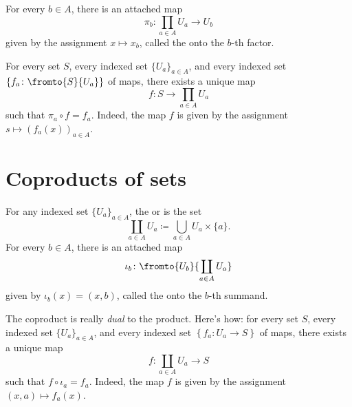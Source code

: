 For every $b\in A$, there is an attached map
\[
	\pi_b \colon \prod_{a\in A}U_a \to U_b
\]
given by the assignment $x \mapsto x_b$, called the  onto the $b$-th factor.

For every set $S$, every indexed set $\{U_a\}_{a\in A}$, and every indexed set $\left\{f_a\colon\fromto{S}{U_a}\right\}$ of maps, there exists a unique map
\[
	f\colon S \to \prod_{a\in A}U_a
\]
such that $\pi_a\circ f=f_a$.
Indeed, the map $f$ is given by the assignment $s \mapsto (f_a(x))_{a\in A}$.

\section{Coproducts of sets}%
\label{sec:coproducts_of_sets}

For any indexed set $\{U_a\}_{a\in A}$, the  or  is the set
\[
	\coprod_{a\in A}U_a\coloneq\bigcup_{a\in A}U_a\times\{a\}.
\]
For every $b\in A$, there is an attached map
\[
	\iota_b\colon\fromto{U_b}{\coprod_{a\in A}U_a}
\]
given by $\iota_b(x)=(x,b)$, called the  onto the $b$-th summand.

The coproduct is really \emph{dual} to the product.
Here's how: for every set $S$, every indexed set $\{U_a\}_{a\in A}$, and every indexed set $\left\{ f_a\colon U_a \to S \right\}$ of maps, there exists a unique map
\[
	f \colon \coprod_{a\in A}U_a \to S
\]
such that $f\circ\iota_a=f_a$.
Indeed, the map $f$ is given by the assignment $ (x,a) \mapsto f_a(x)$. 


